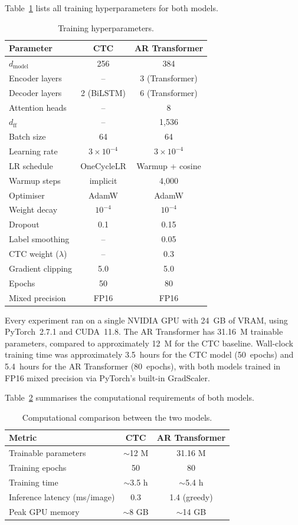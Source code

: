 \documentclass[pdflatex,sn-mathphys-num]{sn-jnl}
\begin{document}
Table~\ref{tab:hyperparams} lists all training hyperparameters for both models.

\begin{table}[t]
\centering
\caption{Training hyperparameters.}
\label{tab:hyperparams}
\begin{tabular}{lcc}
\toprule
\textbf{Parameter} & \textbf{CTC} & \textbf{AR Transformer} \\
\midrule
$d_{\text{model}}$ & 256 & 384 \\
Encoder layers & -- & 3 (Transformer) \\
Decoder layers & 2 (BiLSTM) & 6 (Transformer) \\
Attention heads & -- & 8 \\
$d_{\text{ff}}$ & -- & 1,536 \\
Batch size & 64 & 64 \\
Learning rate & $3 \times 10^{-4}$ & $3 \times 10^{-4}$ \\
LR schedule & OneCycleLR & Warmup + cosine \\
Warmup steps & implicit & 4,000 \\
Optimiser & AdamW & AdamW \\
Weight decay & $10^{-4}$ & $10^{-4}$ \\
Dropout & 0.1 & 0.15 \\
Label smoothing & -- & 0.05 \\
CTC weight ($\lambda$) & -- & 0.3 \\
Gradient clipping & 5.0 & 5.0 \\
Epochs & 50 & 80 \\
Mixed precision & FP16 & FP16 \\
\bottomrule
\end{tabular}
\end{table}

Every experiment ran on a single NVIDIA GPU with 24~GB of VRAM, using PyTorch~2.7.1 and CUDA~11.8. The AR Transformer has 31.16~M trainable parameters, compared to approximately 12~M for the CTC baseline. Wall-clock training time was approximately 3.5~hours for the CTC model (50~epochs) and 5.4~hours for the AR Transformer (80~epochs), with both models trained in FP16 mixed precision via PyTorch's built-in GradScaler.

Table~\ref{tab:compute} summarises the computational requirements of both models.

\begin{table}[t]
\centering
\caption{Computational comparison between the two models.}
\label{tab:compute}
\begin{tabular}{lcc}
\toprule
\textbf{Metric} & \textbf{CTC} & \textbf{AR Transformer} \\
\midrule
Trainable parameters & $\sim$12 M & 31.16 M \\
Training epochs & 50 & 80 \\
Training time & $\sim$3.5 h & $\sim$5.4 h \\
Inference latency (ms/image) & 0.3 & 1.4 (greedy) \\
Peak GPU memory & $\sim$8 GB & $\sim$14 GB \\
\bottomrule
\end{tabular}
\end{table}
\end{document}
